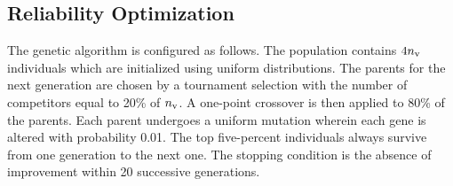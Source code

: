 \subsection{Reliability Optimization}
The genetic algorithm is configured as follows.
The population contains $4 {n_\text{v}}$ individuals which are initialized using uniform distributions.
The parents for the next generation are chosen by a tournament selection with the number of competitors equal to 20\% of ${n_\text{v}}$.
A one-point crossover is then applied to 80\% of the parents.
Each parent undergoes a uniform mutation wherein each gene is altered with probability 0.01.
The top five-percent individuals always survive from one generation to the next one.
The stopping condition is the absence of improvement within 20 successive generations.
